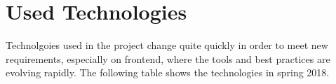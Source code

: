 \chapter{Used Technologies}
\label{chap:technologies}

Technolgoies used in the project change quite quickly in order to meet new requirements,
especially on frontend, where the tools and best practices are evolving rapidly.
The following table shows the technologies in spring 2018.


